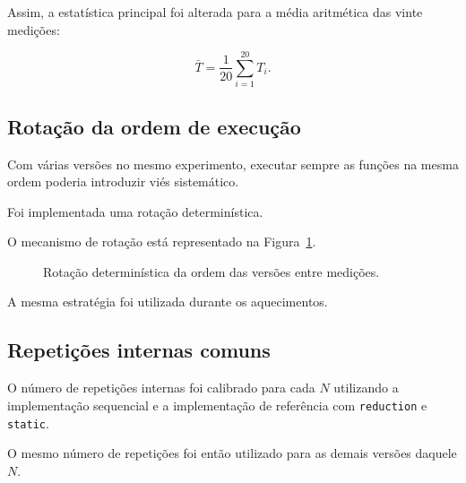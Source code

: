 Assim, a estatística principal foi alterada para a média aritmética das
vinte medições:

\[
\bar{T}
=
\frac{1}{20}
\sum_{i=1}^{20}T_i.
\]


\subsection{Rotação da ordem de execução}

Com várias versões no mesmo experimento, executar sempre as funções na mesma
ordem poderia introduzir viés sistemático.

Foi implementada uma rotação determinística.

O mecanismo de rotação está representado na
Figura~\ref{fig:atvd07-rotacao}.

\begin{figure}[htbp]
    \centering
    \caption{Rotação determinística da ordem das versões entre medições.}
    \label{fig:atvd07-rotacao}
\end{figure}

A mesma estratégia foi utilizada durante os aquecimentos.


\subsection{Repetições internas comuns}

O número de repetições internas foi calibrado para cada \(N\) utilizando a
implementação sequencial e a implementação de referência com
\texttt{reduction} e \texttt{static}.

O mesmo número de repetições foi então utilizado para as demais versões
daquele \(N\).

